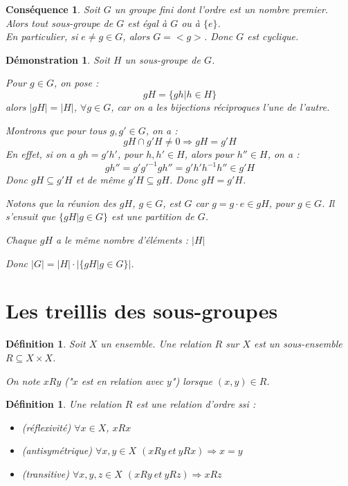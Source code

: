 \documentclass[a4paper, oneside]{report}
\theoremstyle{break}
\newtheorem{defi}[thm]{Définition}
\newtheorem{cons}[thm]{Conséquence}
\newtheorem*{demo}{Démonstration}
\newcommand{\x}{\times}
\begin{document}
\begin{cons}
	Soit $G$ un groupe fini dont l'ordre est un nombre premier.\\
	Alors tout sous-groupe de $G$ est égal à $G$ ou à $\{e\}$.\\
	En particulier, si $e\neq g\in G$, alors $G=<g>$. Donc $G$ est cyclique.
\end{cons}

\begin{demo}
	Soit $H$ un sous-groupe de $G$.
	
	Pour $g\in G$, on pose :
	$$gH=\{gh | h\in H \}$$
	alors $|gH|=|H|$, $\forall g\in G$, car on a les bijections réciproques l'une de l'autre.
	
	Montrons que pour tous $g,g'\in G$, on a :
	$$gH\cap g'H \neq 0 \Rightarrow gH=g'H$$
	En effet, si on a $gh=g'h'$, pour $h,h'\in H$, alors pour $h''\in H$, on a :
	$$gh''=g'g'^{-1}gh''=g'h'h^{-1}h'' \in g'H$$
	Donc $gH\subseteq g'H$ et de même $g'H \subseteq gH$. Donc $gH=g'H$.
	
	Notons que la réunion des $gH$, $g\in G$, est $G$ car $g=g \cdot e \in gH$, pour $g\in G$. Il s'ensuit que $\{gH| g\in G \}$ est une partition de $G$.
	
	Chaque $gH$ a le même nombre d'éléments : $|H|$
	
	Donc $|G| = |H| \cdot |\{gH | g\in G \}|$.
\end{demo}

\section{Les treillis des sous-groupes}

\begin{defi}
	Soit $X$ un ensemble. Une relation $R$ sur $X$ est un sous-ensemble $R\subseteq X\x X$.
	
	On note $xRy$ ("$x$ est en relation avec $y$") lorsque $(x,y)\in R$.	
\end{defi}

\begin{defi} 
	Une relation $R$ est une relation d'ordre ssi :
	\begin{itemize}
	\item (réflexivité) $\forall x \in X$, $xRx$
	\item (antisymétrique) $\forall x,y\in X$ $(xRy~et~yRx)\Rightarrow x=y$
	\item (transitive) $\forall x,y,z\in X$ $(xRy~et~yRz) \Rightarrow xRz$
	\end{itemize}
\end{defi}
\end{document}
